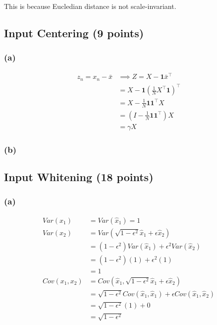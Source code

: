 \documentclass[a4paper,12pt]{article}
\begin{document}
This is because Eucledian distance is not scale-invariant.

\subsection{Input Centering (9 points)}

\subsubsection{(a)}

$$
\begin{aligned}
z_n = x_n - \bar{x} & \implies Z = X - \mathbf{1}\bar{x}^\top \\
& = X - \mathbf{1} \left( \frac{1}{N}X^\top \mathbf{1} \right)^\top \\
& = X - \frac{1}{N}\mathbf{1}\mathbf{1}^\top X \\
& = \left(I - \frac{1}{N}\mathbf{1}\mathbf{1}^\top\right)X \\
& = \gamma X
\end{aligned}
$$

\subsubsection{(b)}

\subsection{Input Whitening (18 points)}

\subsubsection{(a)}

$$
\begin{aligned}
Var(x_1) & = Var(\hat{x}_1) = 1 \\
Var(x_2) & = Var(\sqrt{1-\epsilon^2}\hat{x}_1 + \epsilon \hat{x}_2) \\
    & = (1-\epsilon^2) Var(\hat{x}_1) + \epsilon^2 Var(\hat{x}_2) \\
    & = (1-\epsilon^2)(1) + \epsilon^2(1) \\
    & = 1 \\
Cov(x_1, x_2) & = Cov(\hat{x}_1, \sqrt{1-\epsilon^2}\hat{x}_1 + \epsilon \hat{x}_2) \\
    & = \sqrt{1-\epsilon^2}Cov(\hat{x}_1, \hat{x}_1) + \epsilon Cov(\hat{x}_1, \hat{x}_2) \\
    & = \sqrt{1-\epsilon^2}(1) + 0 \\
    & = \sqrt{1-\epsilon^2}
\end{aligned}
$$
\end{document}
